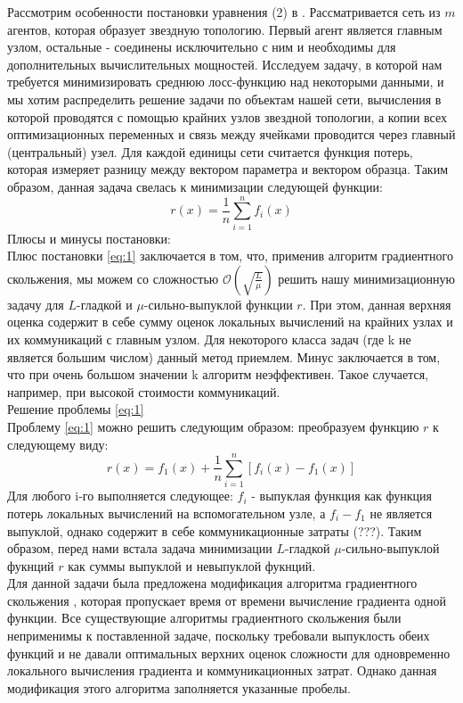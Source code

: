 \documentclass{article}
\begin{document}
Рассмотрим особенности постановки уравнения (2) в \cite{kovalev2022optimal}. Рассматривается сеть из $m$ агентов, которая образует звездную топологию. Первый агент является главным узлом, остальные - соединены исключительно с ним и необходимы для дополнительных вычислительных мощностей. Исследуем задачу, в которой нам требуется минимизировать среднюю лосс-функцию над некоторыми данными, и мы хотим распределить решение задачи по объектам нашей сети, вычисления в которой проводятся с помощью крайних узлов звездной топологии, а копии всех оптимизационных переменных и связь между ячейками проводится через главный (центральный) узел. Для каждой единицы сети считается функция потерь, которая измеряет разницу между вектором параметра и вектором образца. Таким образом, данная задача свелась к минимизации следующей функции: \\
\begin{equation}
    \label{eq:1}
    r(x) = \frac{1}{n} \sum \limits_{i = 1}^{n} f _i(x)
\end{equation}
Плюсы и минусы постановки:\\
Плюс постановки \ref{eq:1} заключается в том, что, применив алгоритм градиентного скольжения, мы можем со сложностью $\mathcal{O}(\sqrt{\frac{L}{\mu}})$ решить нашу минимизационную задачу для $L$-гладкой и $\mu$-сильно-выпуклой функции $r$. При этом, данная верхняя оценка содержит в себе сумму оценок локальных вычислений на крайних узлах и их коммуникаций с главным узлом. Для некоторого класса задач (где k не является большим числом) данный метод приемлем. Минус заключается в том, что при очень большом значении k алгоритм неэффективен. Такое случается, например, при высокой стоимости коммуникаций. \\
Решение проблемы \ref{eq:1}\\
Проблему \ref{eq:1} можно решить следующим образом: преобразуем функцию $r$ к следующему виду:\\
\begin{equation}
    \label{eq:2}
    r(x) = f_1(x) + \frac{1}{n}\sum\limits_{i = 1}^{n}[f_i(x) - f_1(x)]
\end{equation}
Для любого i-го выполняется следующее: $f_i$ - выпуклая функция как функция потерь локальных вычислений на вспомогательном узле, а $f_i - f_1$ не является выпуклой, однако содержит в себе коммуникационные затраты (???). Таким образом, перед нами встала задача минимизации $L$-гладкой $\mu$-сильно-выпуклой фукнций $r$ как суммы выпуклой и невыпуклой фукнций. \\
Для данной задачи была предложена модификация алгоритма градиентного скольжения \cite{kovalev2022optimal}, которая пропускает время от времени вычисление градиента одной функции. Все существующие алгоритмы градиентного скольжения были неприменимы к поставленной задаче, поскольку требовали выпуклость обеих функций и не давали оптимальных верхних оценок сложности для одновременно локального вычисления градиента и коммуникационных затрат. Однако данная модификация этого алгоритма заполняется указанные пробелы.
\end{document}
